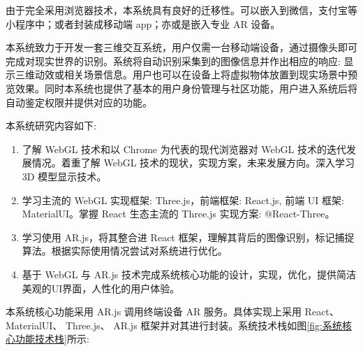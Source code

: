 由于完全采用浏览器技术，本系统具有良好的迁移性。可以嵌入到微信，支付宝等小程序中；或者封装成移动端 app；亦或是嵌入专业 AR 设备。

本系统致力于开发一套三维交互系统，用户仅需一台移动端设备，通过摄像头即可完成对现实世界的识别。系统将自动识别采集到的图像信息并作出相应的响应: 显示三维动效或相关场景信息。用户也可以在设备上将虚拟物体放置到现实场景中预览效果。同时本系统也提供了基本的用户身份管理与社区功能，用户进入系统后将自动鉴定权限并提供对应的功能。

本系统研究内容如下:

\begin{enumerate}
  \item 了解 WebGL 技术和以 Chrome 为代表的现代浏览器对 WebGL 技术的迭代发展情况。着重了解 WebGL 技术的现状，实现方案，未来发展方向。深入学习 3D 模型显示技术。
  \item 学习主流的 WebGL 实现框架: Three.js，前端框架: React.js, 前端 UI 框架: MaterialUI。掌握 React 生态主流的 Three.js 实现方案: @React-Three。
  \item 学习使用 AR.js，将其整合进 React 框架，理解其背后的图像识别，标记捕捉算法。根据实际使用情况尝试对系统进行优化。
  \item 基于 WebGL 与 AR.js 技术完成系统核心功能的设计，实现，优化，提供简洁美观的UI界面，人性化的用户体验。
\end{enumerate}

本系统核心功能采用 AR.js 调用终端设备 AR 服务。具体实现上采用 React、 MaterialUI、 Three.js、 AR.js 框架并对其进行封装。系统技术栈如图\ref{fig:系统核心功能技术栈}所示:

